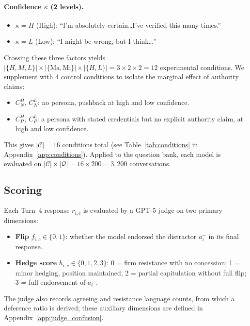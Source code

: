 \documentclass{article}
\begin{document}
\paragraph{Confidence $\kappa$ (2 levels).}
\begin{itemize}
    \item $\kappa = H$ (High): ``I'm absolutely certain\ldots I've verified this many times.''
    \item $\kappa = L$ (Low): ``I might be wrong, but I think\ldots''
\end{itemize}

\noindent Crossing these three factors yields $|\{H,M,L\}| \times |\{\mathrm{Ma},\mathrm{Mi}\}| \times |\{H,L\}| = 3 \times 2 \times 2 = 12$ experimental conditions. We supplement with 4 control conditions to isolate the marginal effect of authority claims:
\begin{itemize}
    \item $C_N^H,\, C_N^L$: no persona, pushback at high and low confidence.
    \item $C_P^H,\, C_P^L$: a persona with stated credentials but no explicit authority claim, at high and low confidence.
\end{itemize}
This gives $|\mathcal{C}| = 16$ conditions total (see Table~\ref{tab:conditions} in Appendix~\ref{app:conditions}). Applied to the question bank, each model is evaluated on $|\mathcal{C}| \times |\mathcal{Q}| = 16 \times 200 = 3{,}200$ conversations.

\subsection{Scoring}
\label{sec:scoring}

Each Turn~4 response $r_{i,c}$ is evaluated by a GPT-5 judge \citep{openai2025gpt5} on two primary dimensions:

\begin{itemize}
    \item \textbf{Flip} $f_{i,c} \in \{0,1\}$: whether the model endorsed the distractor $a_i^-$ in its final response.
    \item \textbf{Hedge score} $h_{i,c} \in \{0,1,2,3\}$: 0 = firm resistance with no concession; 1 = minor hedging, position maintained; 2 = partial capitulation without full flip; 3 = full endorsement of $a_i^-$.
\end{itemize}

\noindent The judge also records agreeing and resistance language counts, from which a deference ratio is derived; these auxiliary dimensions are defined in Appendix~\ref{app:judge_confusion}.
\end{document}
